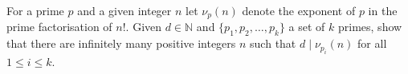 For a prime $ p$ and a given integer $ n$ let $ \nu_p(n)$ denote the exponent of $ p$ in the prime factorisation of $ n!$. Given $ d \in \mathbb{N}$ and $ \{p_1,p_2,\ldots,p_k\}$ a set of $ k$ primes, show that there are infinitely many positive integers $ n$ such that $ d\mid \nu_{p_i}(n)$ for all $ 1 \leq i \leq k$.